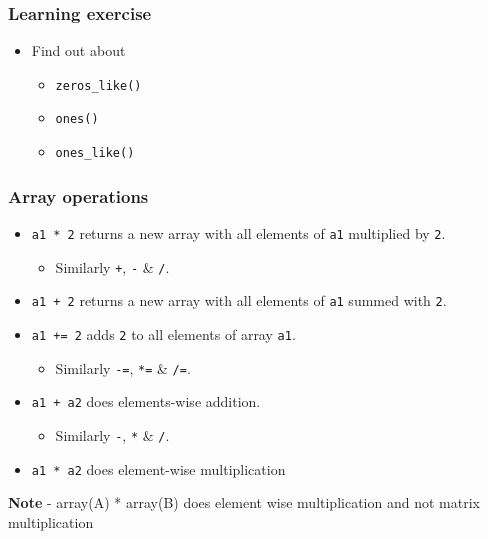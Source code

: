 \documentclass[presentation]{beamer}
\begin{document}
\begin{frame}
\frametitle{Learning exercise}
\label{sec-12}

\begin{itemize}
\item Find out about

\begin{itemize}
\item \texttt{zeros\_like()}
\item \texttt{ones()}
\item \texttt{ones\_like()}
\end{itemize}

\end{itemize}
\end{frame}
\begin{frame}
\frametitle{Array operations}
\label{sec-13}

\begin{itemize}
\item \texttt{a1 * 2}
    returns a new array with all elements of \texttt{a1} multiplied by \texttt{2}.

\begin{itemize}
\item Similarly \texttt{+}, \texttt{-} \& \texttt{/}.
\end{itemize}

\item \texttt{a1 + 2}
    returns a new array with all elements of \texttt{a1} summed with \texttt{2}.
\item \texttt{a1 += 2}
    adds \texttt{2} to all elements of array \texttt{a1}.

\begin{itemize}
\item Similarly \texttt{-=}, \texttt{*=} \& \texttt{/=}.
\end{itemize}

\item \texttt{a1 + a2}
    does elements-wise addition.

\begin{itemize}
\item Similarly \texttt{-}, \texttt{*} \& \texttt{/}.
\end{itemize}

\item \texttt{a1 * a2}
    does element-wise multiplication
\end{itemize}


  \textbf{Note} - array(A) * array(B) does element wise multiplication and not matrix multiplication
\end{frame}
\end{document}
